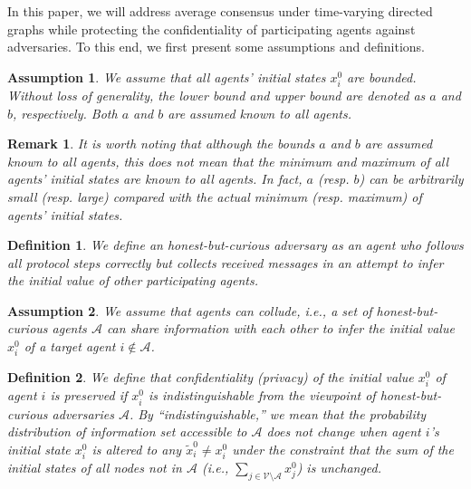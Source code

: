 \documentclass{IEEEtran}
\newtheorem{Definition}{Definition}
\newtheorem{Remark}{Remark}
\newtheorem{Assumption}{Assumption}
\begin{document}
In this paper, we will address average consensus under time-varying directed graphs while protecting the confidentiality of participating agents against adversaries. To this end, we first present some assumptions and definitions.

\begin{Assumption}\label{assumption_initial_states}
	We assume that all agents' initial states $x_i^0$ are bounded. Without loss of generality, the lower bound and upper bound are denoted as $a$ and $b$, respectively. Both $a$ and $b$ are assumed known to all agents.
\end{Assumption}

\begin{Remark}\label{remark_initial_states}
	It is worth noting that although the bounds $a$ and $b$ are assumed known to all agents, this does not mean that the minimum and maximum of all agents' initial states are known to all agents. In fact, $a$ (resp. $b$) can be arbitrarily small (resp. large) compared with the actual minimum (resp. maximum) of agents' initial states.
\end{Remark}

\begin{Definition}\label{honest_but_curious_definition}
	We define an honest-but-curious adversary as an agent who follows all protocol steps correctly but collects received messages in an attempt to infer the initial value of other participating agents.
\end{Definition}

\begin{Assumption}\label{assumption_collude}
	We assume that agents can collude, i.e., a set of honest-but-curious agents $\mathcal{A}$ can share information with each other to infer the initial value $x_i^0$ of a target agent $i \notin \mathcal{A}$.
\end{Assumption}

\begin{Definition}\label{privacy_preservation_definition}
	We define that confidentiality (privacy) of the initial value $x_i^0$ of agent $i$ is preserved if $x_i^0$ is indistinguishable from the viewpoint of honest-but-curious adversaries $\mathcal{A}$. By ``indistinguishable,'' we mean that the probability distribution of information set accessible to $\mathcal{A}$ does not change when agent $i$'s initial state $x_i^0$ is altered to any $\tilde{x}_i^0 \neq x_i^0$ under the constraint that the sum of the initial states of all nodes not in $\mathcal{A}$ (i.e., $\sum_{ j\in \mathcal{V}\setminus\mathcal{A}} x_j^0$) is unchanged.
\end{Definition}
\end{document}
